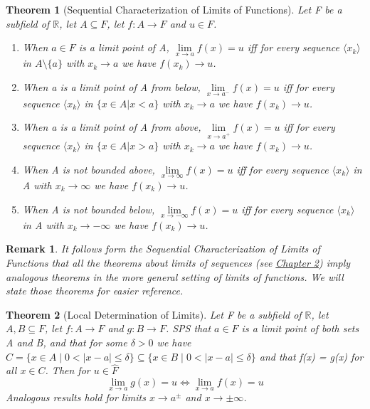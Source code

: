 \documentclass[11pt, oneside]{book}
\theoremstyle{break}
\newtheorem{thm}{Theorem}[section]
\newtheorem*{remark}{Remark}
\newcommand{\bb}[1]{\mathbb{#1}}			%
\begin{document}
\begin{thm}[Sequential Characterization of Limits of Functions]
	Let F be a subfield of $\bb{R}$, let $A \subseteq F$, let $f: A \to F$ and $u \in F$.
	\begin{enumerate}
		\item When $a \in F$ is a limit point of A, $\lim\limits_{x \to a} f(x) = u$ iff for every sequence $\langle x_k \rangle$ in $A \setminus \{a\}$ with $x_k \to a$ we have $f(x_k) \to u$.
		\item When a is a limit point of A from below, $\lim\limits_{x \to a^-} f(x) = u$ iff for every sequence $\langle x_k \rangle$ in $\{x \in A | x < a\}$ with $x_k \to a$ we have $f(x_k) \to u$.
		\item When a is a limit point of A from above, $\lim\limits_{x \to a^+} f(x) = u$ iff for every sequence $\langle x_k \rangle$ in $\{x \in A | x > a\}$ with $x_k \to a$ we have $f(x_k) \to u$.
		\item When A is not bounded above, $\lim\limits_{x \to \infty} f(x) = u$ iff for every sequence $\langle x_k \rangle$ in A with $x_k \to \infty$ we have $f(x_k) \to u$.
		\item When A is not bounded below, $\lim\limits_{x \to -\infty} f(x) = u$ iff for every sequence $\langle x_k \rangle$ in A with $x_k \to -\infty$ we have $f(x_k) \to u$.
	\end{enumerate}
\end{thm}

\begin{remark}
	It follows form the Sequential Characterization of Limits of Functions that all the theorems about limits of sequences (see \hyperref[chp2]{Chapter 2}) imply analogous theorems in the more general setting of limits of functions. We will state those theorems for easier reference.
\end{remark}

\begin{thm}[Local Determination of Limits]
	Let F be a subfield of $\bb{R}$, let $A, B \subseteq F$, let $f: A \to F$ and $g: B \to F$. SPS that $a \in F$ is a limit point of both sets A and B, and that for some $\delta > 0$ we have $C = \{x \in A \; | \; 0 < |x - a| \leq \delta\} \subseteq \{x \in B \; | \; 0 < |x - a| \leq \delta\}$ and that f(x) = g(x) for all $x \in C$. Then for $u \in \hat{F}$
		\[
			\lim_{x \to a} g(x) = u \iff \lim_{x \to a} f(x) = u
		\]
	Analogous results hold for limits $x \to a^\pm$ and $x \to \pm \infty$.
\end{thm}
\end{document}

